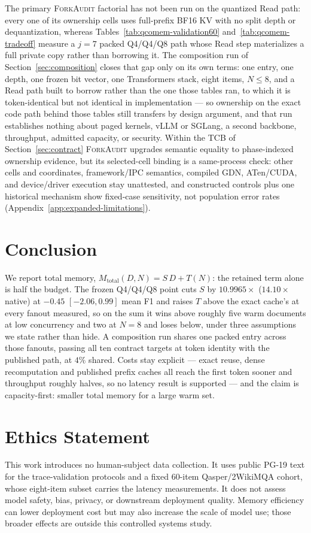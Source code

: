 \documentclass{article}
\newcommand{\method}{\textsc{ForkAudit}}
\begin{document}
The primary \method{} factorial has not been run on the quantized Read path:
every one of its ownership cells uses
full-prefix BF16 KV with no split depth or dequantization, whereas
Tables~\ref{tab:qcomem-validation60} and~\ref{tab:qcomem-tradeoff} measure a
$j=7$ packed Q4/Q4/Q8 path whose Read step materializes a full private copy
rather than borrowing it.  The composition run of
Section~\ref{sec:composition} closes that gap only on its own terms: one entry,
one depth, one frozen bit vector, one Transformers stack, eight items,
$N\leq8$, and a Read path built to borrow rather than the one those tables ran,
to which it is token-identical but not identical in implementation --- so
ownership on the exact code path behind those tables still transfers by design
argument, and that run establishes nothing about paged kernels, vLLM or
SGLang, a second backbone, throughput, admitted capacity, or security.
Within the TCB of Section~\ref{sec:contract} \method{} upgrades semantic
equality to phase-indexed ownership evidence, but its selected-cell binding is
a same-process check: other cells and coordinates, framework/IPC semantics,
compiled GDN, ATen/CUDA, and device/driver execution stay unattested, and
constructed controls plus one historical mechanism show fixed-case sensitivity,
not population error rates (Appendix~\ref{app:expanded-limitations}).

\FloatBarrier

\section{Conclusion}

We report total memory, $M_{\mathrm{total}}(D,N)=S\,D+T(N)$: the retained term
alone is half the budget.  The frozen Q4/Q4/Q8 point cuts $S$ by $10.9965\times$
($14.10\times$ native) at $-0.45$ $[-2.06,0.99]$ mean F1 and raises $T$ above the
exact cache's at every fanout measured, so on the sum it wins above roughly five
warm documents at low concurrency and two at $N=8$ and loses below, under three
assumptions we state rather than hide.  A composition run shares one packed entry
across those fanouts, passing all ten contract targets at token identity with the
published path, at $4\%$ shared.  Costs stay explicit --- exact reuse, dense
recomputation and published prefix caches all reach the first token sooner and
throughput roughly halves, so no latency result is supported --- and the claim is
capacity-first: smaller total memory for a large warm set.

\section*{Ethics Statement}
This work introduces no human-subject data collection. It uses public PG-19 text
for the trace-validation protocols and a fixed 60-item Qasper/2WikiMQA cohort,
whose eight-item subset carries the latency measurements. It does not assess
model safety, bias, privacy, or downstream deployment quality. Memory efficiency
can lower deployment cost but may also increase the scale of model use; those
broader effects are outside this controlled systems study.
\end{document}
